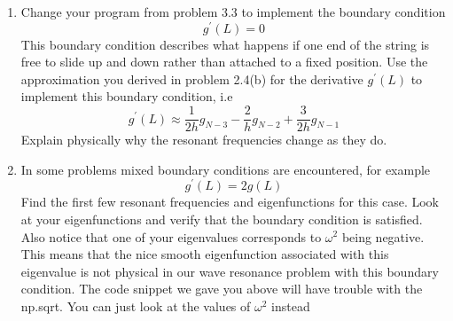 \begin{problem} \label{P3.4}
\begin{enumerate}[label=(\alph*)]
	\item Change your program from problem 3.3 to implement the boundary
condition  \begin{equation*}
		g^\prime(L) = 0
				\end{equation*}
				This boundary condition describes what happens if one end of the
string is free to slide up and down rather than attached to a fixed
position. Use the approximation you derived in problem 2.4(b) for the
derivative $g^\prime(L)$ to implement this boundary condition, i.e
\begin{equation*}
		g^\prime(L) \approx \frac{1}{2h}g_{N-3} - \frac{2}{h}g_{N-2} + \frac{3}{2h}g_{N-1}
				\end{equation*}Explain physically why the resonant frequencies change as they do.
				\item In some problems mixed boundary conditions are encountered, for
example\begin{equation*}
		g^\prime(L) = 2g(L)
				\end{equation*}Find the first few resonant frequencies and eigenfunctions for this
case. Look at your eigenfunctions and verify that the boundary condition is satisfied. Also notice that one of your eigenvalues corresponds
to $\omega^2$ being negative. This means that the nice smooth eigenfunction
associated with this eigenvalue is not physical in our wave resonance
problem with this boundary condition. The code snippet we gave you
above will have trouble with the np.sqrt. You can just look at the
values of $\omega^2$ instead
\end{enumerate}
\end{problem}
